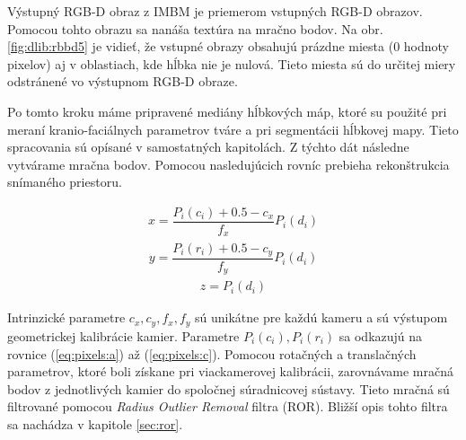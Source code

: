 Výstupný RGB-D obraz z IMBM je priemerom vstupných RGB-D obrazov. Pomocou tohto obrazu sa nanáša textúra na mračno bodov. Na obr. \ref{fig:dlib:rbbd5} je vidieť, že vstupné obrazy obsahujú prázdne miesta (0 hodnoty pixelov) aj v oblastiach, kde hĺbka nie je nulová.
Tieto miesta sú do určitej miery odstránené vo výstupnom RGB-D obraze.



Po tomto kroku máme pripravené mediány hĺbkových máp, ktoré su použité pri meraní kranio-faciálnych parametrov tváre a pri segmentácii hĺbkovej mapy. Tieto spracovania sú opísané v samostatných kapitolách. Z týchto dát následne vytvárame mračna bodov. Pomocou nasledujúcich rovníc prebieha rekonštrukcia snímaného priestoru. 

\begin{equation}
\label{eq:project:x}
\begin{aligned}
x=\dfrac{P_{i}(c_{i})+0.5-c_{x}}{f_{x}}P_{i}(d_{i})
\end{aligned}
\end{equation}
\begin{equation}
\label{eq:project:y}
\begin{aligned}
y=\dfrac{P_{i}(r_{i})+0.5-c_{y}}{f_{y}}P_{i}(d_{i})
\end{aligned}
\end{equation}
\begin{equation}
\label{eq:project:z}
\begin{aligned}
z=P_{i}(d_{i})
\end{aligned}
\end{equation}

Intrinzické parametre $c_x, c_y, f_x, f_y$ sú unikátne pre každú kameru a sú výstupom geometrickej kalibrácie kamier. Parametre $P_i(c_i),P_i(r_i)$ sa odkazujú na rovnice (\ref{eq:pixels:a}) až (\ref{eq:pixels:c}). Pomocou rotačných a translačných parametrov, ktoré boli získane pri viackamerovej kalibrácii, zarovnávame mračná bodov z jednotlivých kamier do spoločnej súradnicovej sústavy. Tieto mračná sú filtrované pomocou \textit{Radius Outlier Removal} filtra (ROR). Bližší opis tohto filtra sa nachádza v kapitole \ref{sec:ror}. 


